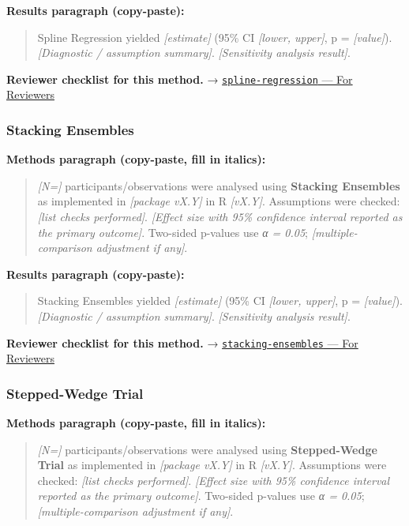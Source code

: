 \documentclass[
]{article}
\begin{document}
\textbf{Results paragraph (copy-paste):}

\begin{quote}
Spline Regression yielded \emph{{[}estimate{]}} (95\% CI \emph{{[}lower,
upper{]}}, p = \emph{{[}value{]}}). \emph{{[}Diagnostic / assumption
summary{]}}. \emph{{[}Sensitivity analysis result{]}}.
\end{quote}

\textbf{Reviewer checklist for this method.} →
\href{../chapters/07-regression/spline-regression.Rmd\#for-reviewers}{\texttt{spline-regression}
--- For Reviewers}

\subsubsection{Stacking Ensembles}\label{stacking-ensembles}

\textbf{Methods paragraph (copy-paste, fill in italics):}

\begin{quote}
\emph{{[}N={]}} participants/observations were analysed using
\textbf{Stacking Ensembles} as implemented in \emph{{[}package vX.Y{]}}
in R \emph{{[}vX.Y{]}}. Assumptions were checked: \emph{{[}list checks
performed{]}}. \emph{{[}Effect size with 95\% confidence interval
reported as the primary outcome{]}}. Two-sided p-values use \emph{α =
0.05}; \emph{{[}multiple-comparison adjustment if any{]}}.
\end{quote}

\textbf{Results paragraph (copy-paste):}

\begin{quote}
Stacking Ensembles yielded \emph{{[}estimate{]}} (95\% CI
\emph{{[}lower, upper{]}}, p = \emph{{[}value{]}}). \emph{{[}Diagnostic
/ assumption summary{]}}. \emph{{[}Sensitivity analysis result{]}}.
\end{quote}

\textbf{Reviewer checklist for this method.} →
\href{../chapters/13-ml/stacking-ensembles.Rmd\#for-reviewers}{\texttt{stacking-ensembles}
--- For Reviewers}

\subsubsection{Stepped-Wedge Trial}\label{stepped-wedge-trial}

\textbf{Methods paragraph (copy-paste, fill in italics):}

\begin{quote}
\emph{{[}N={]}} participants/observations were analysed using
\textbf{Stepped-Wedge Trial} as implemented in \emph{{[}package vX.Y{]}}
in R \emph{{[}vX.Y{]}}. Assumptions were checked: \emph{{[}list checks
performed{]}}. \emph{{[}Effect size with 95\% confidence interval
reported as the primary outcome{]}}. Two-sided p-values use \emph{α =
0.05}; \emph{{[}multiple-comparison adjustment if any{]}}.
\end{quote}
\end{document}
